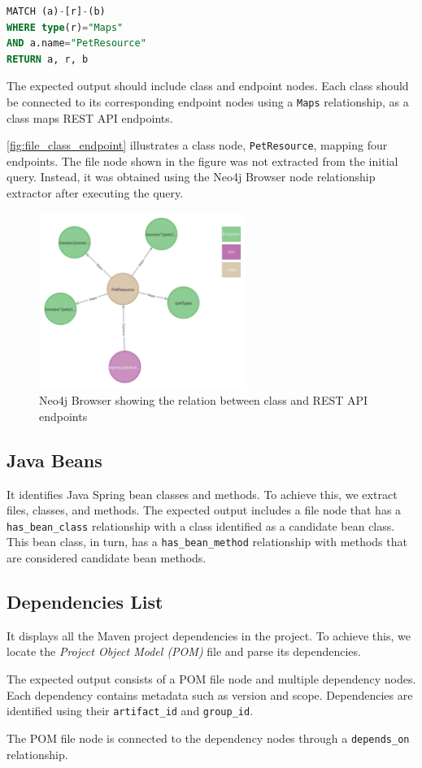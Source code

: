 \begin{lstlisting}[language=SQL,caption={PetResource class endpoints cypher query}]
MATCH (a)-[r]-(b)
WHERE type(r)="Maps"
AND a.name="PetResource"
RETURN a, r, b
\end{lstlisting}

The expected output should include class and endpoint nodes. Each class should be connected to its corresponding endpoint nodes using a \texttt{Maps} relationship, as a class maps REST API endpoints.

\autoref{fig:file_class_endpoint} illustrates a class node, \texttt{PetResource}, mapping four endpoints. The file node shown in the figure was not extracted from the initial query. Instead, it was obtained using the Neo4j Browser node relationship extractor after executing the query.

\begin{figure}[H]
    \centering
    \includegraphics[width=0.6\textwidth]{figures/file_class_endpoint.png}
    \caption{Neo4j Browser showing the relation between class and REST API endpoints}
    \label{fig:file_class_endpoint}
\end{figure}

\subsection{Java Beans}
It identifies Java Spring bean classes and methods. To achieve this, we extract files, classes, and methods. The expected output includes a file node that has a \texttt{has\_bean\_class} relationship with a class identified as a candidate bean class. This bean class, in turn, has a \texttt{has\_bean\_method} relationship with methods that are considered candidate bean methods.

\subsection{Dependencies List}
It displays all the Maven project dependencies in the project. To achieve this, we locate the \textit{Project Object Model (POM)} file and parse its dependencies.

The expected output consists of a POM file node and multiple dependency nodes. Each dependency contains metadata such as version and scope. Dependencies are identified using their \texttt{artifact\_id} and \texttt{group\_id}.

The POM file node is connected to the dependency nodes through a \texttt{depends\_on} relationship.
